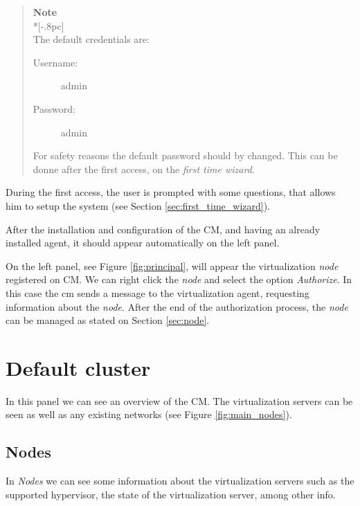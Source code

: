 \begin{quote}
	{\large \bf Note} \\*[-.8pc]
	\underline{\hspace{6in}} \\
    The default credentials are:
	\begin{description}
        	\item[Username:] admin
	        \item[Password:] admin
	\end{description}
    For safety reasons the default password should by changed. This can be donne after the first access, on the \textit{first time wizard}.

\end{quote}

During the first access, the user is prompted with some questions, that allows him to setup the system (see Section \ref{sec:first_time_wizard}).

After the installation and configuration of the CM, and having an already installed agent, it should appear automatically on the left panel.

On the left panel, see Figure \ref{fig:principal}, will appear the virtualization \emph{node} registered on CM. We can right click the \emph{node} and select the option \emph{Authorize}. In this case the cm sends a message to the virtualization agent, requesting information about the \emph{node}. After the end of the authorization process, the \emph{node} can be managed as stated on Section \ref{sec:node}.

\pagebreak

\section{Default cluster}

In this panel we can see an overview of the CM. The virtualization servers can be seen as well as any existing networks (see Figure \ref{fig:main_nodes}).

\subsection{Nodes}

In \emph{Nodes} we can see some information about the virtualization servers such as the supported hypervisor, the state of the virtualization server, among other info.

